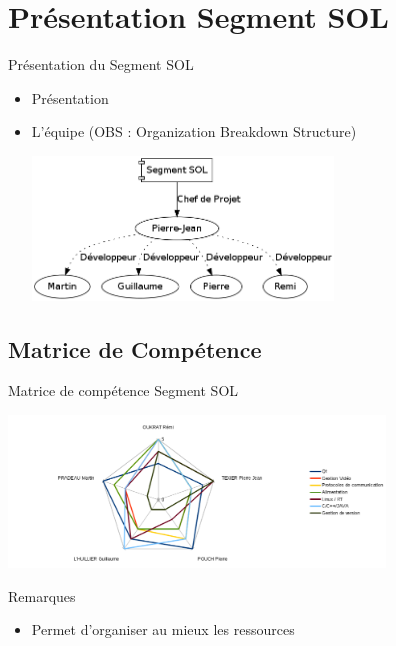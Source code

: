 \documentclass[11pt]{beamer}
\begin{document}
	
	\section{Présentation Segment SOL}
	\begin{frame}{Présentation du Segment SOL}
		\begin{itemize}
		    \item Présentation
		    \pause
			\item L'équipe (OBS : Organization Breakdown Structure)\\
		    \pause
		    \begin{center}
			\includegraphics[width=8cm]{common/OBS.png}
		    \end{center}
		\end{itemize}
	\end{frame}
	
	
	\subsection[]{Matrice de Compétence}
	\begin{frame}{Matrice de compétence Segment SOL}
		\begin{center}
			\includegraphics[width=10cm]{common/matrice.png}
		\end{center}
			\begin{block}{Remarques}
			  \begin{itemize}
			      \item Permet d'organiser au mieux les ressources
			  \end{itemize}
			\end{block}
	\end{frame}
		
\end{document}
